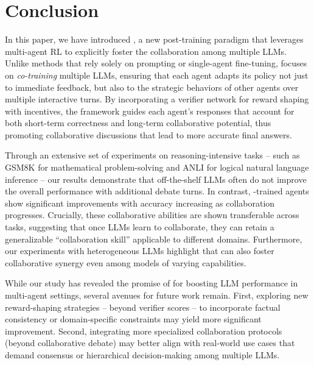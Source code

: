 \section{Conclusion}

In this paper, we have introduced \ours, a new post-training paradigm that leverages multi-agent RL to explicitly foster the collaboration among multiple LLMs. Unlike methods that rely solely on prompting or single-agent fine-tuning, \oursspace focuses on \textit{co-training} multiple LLMs, ensuring that each agent adapts its policy not just to immediate feedback, but also to the strategic behaviors of other agents over multiple interactive turns. By incorporating a verifier network for reward shaping with incentives, the framework guides each agent’s responses that account for both short-term correctness and long-term collaborative potential, thus promoting collaborative discussions that lead to more accurate final answers. 

Through an extensive set of experiments on reasoning-intensive tasks -- such as GSM8K for mathematical problem-solving and ANLI for logical natural language inference -- our results demonstrate that off-the-shelf LLMs often do not improve the overall performance with additional debate turns. In contrast, \ours-trained agents show significant improvements with accuracy increasing as collaboration progresses. Crucially, these collaborative abilities are shown transferable across tasks, suggesting that once LLMs learn to collaborate, they can retain a generalizable ``collaboration skill'' applicable to different domains.
Furthermore, our experiments with heterogeneous LLMs highlight that \oursspace can also foster collaborative synergy even among models of varying capabilities.

While our study has revealed the promise of \oursspace for boosting LLM performance in multi-agent settings, several avenues for future work remain. First, exploring new reward-shaping strategies -- beyond verifier scores -- to incorporate factual consistency or domain-specific constraints may yield more significant improvement. Second, integrating more specialized collaboration protocols (beyond collaborative debate) may better align with real-world use cases that demand consensus or hierarchical decision-making among multiple LLMs. 






